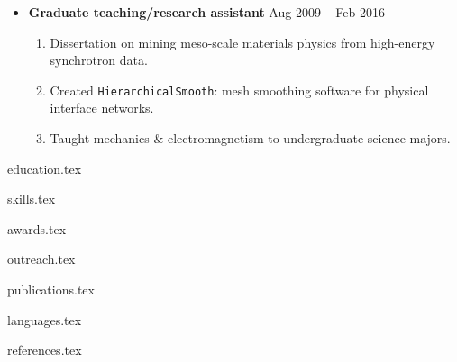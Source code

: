 \documentclass[10.5pt]{article}
\begin{document}
\begin{itemize}
    \item
        \textbf{Graduate teaching/research assistant}
        \hfill  {Aug 2009 -- Feb 2016} \par
        \begin{enumerate}
            \item Dissertation on mining meso-scale materials physics from high-energy synchrotron data.
            \item Created \texttt{HierarchicalSmooth}: mesh smoothing software for physical interface networks. 
            \item Taught mechanics \& electromagnetism to undergraduate science majors.
        \end{enumerate}
\end{itemize} 

{education.tex}

{skills.tex}

{awards.tex}

{outreach.tex}

{publications.tex}

{languages.tex}

{references.tex}
\end{document}
